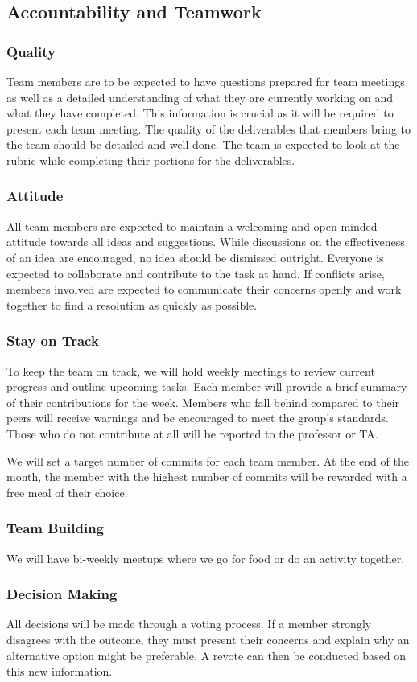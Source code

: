 \documentclass{article}
\begin{document}
\subsection*{Accountability and Teamwork}

\subsubsection*{Quality} 
Team members are to be expected to have questions prepared for team meetings as well as a detailed understanding of what they are currently working on and what they have completed. This information is crucial as it will be required to present each team meeting. The quality of the deliverables that members bring to the team should be detailed and well done. The team is expected to look at the rubric while completing their portions for the deliverables.


\subsubsection*{Attitude}
All team members are expected to maintain a welcoming and open-minded attitude towards all ideas and suggestions. While discussions on the effectiveness of an idea are encouraged, no idea should be dismissed outright. Everyone is expected to collaborate and contribute to the task at hand. If conflicts arise, members involved are expected to communicate their concerns openly and work together to find a resolution as quickly as possible.

\subsubsection*{Stay on Track}
To keep the team on track, we will hold weekly meetings to review current progress and outline upcoming tasks. Each member will provide a brief summary of their contributions for the week. Members who fall behind compared to their peers will receive warnings and be encouraged to meet the group’s standards. Those who do not contribute at all will be reported to the professor or TA.

We will set a target number of commits for each team member. At the end of the month, the member with the highest number of commits will be rewarded with a free meal of their choice.
\subsubsection*{Team Building}
We will have bi-weekly meetups where we go for food or do an activity together.

\subsubsection*{Decision Making} 
All decisions will be made through a voting process. If a member strongly disagrees with the outcome, they must present their concerns and explain why an alternative option might be preferable. A revote can then be conducted based on this new information.
\end{document}
